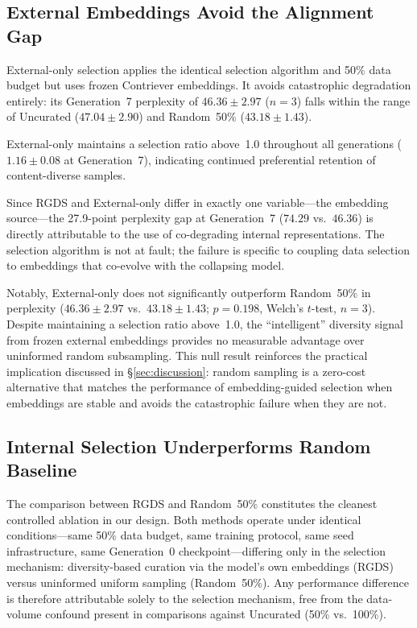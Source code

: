 \subsection{External Embeddings Avoid the Alignment Gap}
\label{sec:result_c2}

External-only selection applies the identical selection algorithm and 50\% data budget but uses frozen Contriever embeddings. It avoids catastrophic degradation entirely: its Generation~7 perplexity of $46.36 \pm 2.97$ ($n{=}3$) falls within the range of Uncurated ($47.04 \pm 2.90$) and Random~50\% ($43.18 \pm 1.43$).

External-only maintains a selection ratio above~1.0 throughout all generations ($1.16 \pm 0.08$ at Generation~7), indicating continued preferential retention of content-diverse samples.

Since RGDS and External-only differ in exactly one variable---the embedding source---the 27.9-point perplexity gap at Generation~7 ($74.29$ vs.\ $46.36$) is directly attributable to the use of co-degrading internal representations. The selection algorithm is not at fault; the failure is specific to coupling data selection to embeddings that co-evolve with the collapsing model.

Notably, External-only does not significantly outperform Random~50\% in perplexity ($46.36 \pm 2.97$ vs.\ $43.18 \pm 1.43$; $p = 0.198$, Welch's $t$-test, $n{=}3$). Despite maintaining a selection ratio above~1.0, the ``intelligent'' diversity signal from frozen external embeddings provides no measurable advantage over uninformed random subsampling. This null result reinforces the practical implication discussed in \S\ref{sec:discussion}: random sampling is a zero-cost alternative that matches the performance of embedding-guided selection when embeddings are stable and avoids the catastrophic failure when they are not.

\subsection{Internal Selection Underperforms Random Baseline}
\label{sec:result_c3}

The comparison between RGDS and Random~50\% constitutes the cleanest controlled ablation in our design. Both methods operate under identical conditions---same 50\% data budget, same training protocol, same seed infrastructure, same Generation~0 checkpoint---differing only in the selection mechanism: diversity-based curation via the model's own embeddings (RGDS) versus uninformed uniform sampling (Random~50\%). Any performance difference is therefore attributable solely to the selection mechanism, free from the data-volume confound present in comparisons against Uncurated (50\% vs.\ 100\%).

